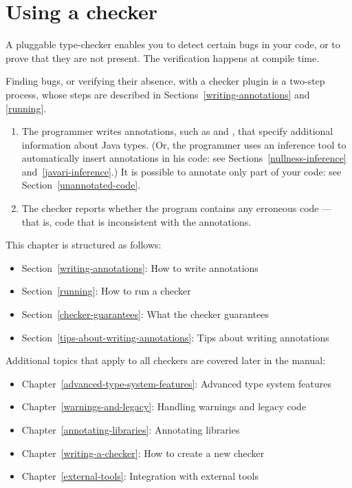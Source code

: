 

\htmlhr
\chapter{Using a checker\label{using-a-checker}}

A pluggable type-checker enables you to detect certain bugs in your code,
or to prove that they are not present.  The verification happens at compile
time.


Finding bugs, or verifying their absence, with a checker plugin is a two-step process, whose steps are
described in Sections~\ref{writing-annotations} and \ref{running}.

\begin{enumerate}

\item The programmer writes annotations, such as  and
  , that specify additional information about Java types.
  (Or, the programmer uses an inference tool to automatically insert
  annotations in his code:  see Sections~\ref{nullness-inference} and~\ref{javari-inference}.)
  It is possible to annotate only part of your code:  see
  Section~\ref{unannotated-code}.

\item The checker reports whether the program contains any erroneous code
  --- that is, code that is inconsistent with the annotations.

\end{enumerate}

This chapter is structured as follows:
\begin{itemize}
\item Section~\ref{writing-annotations}: How to write annotations
\item Section~\ref{running}:  How to run a checker
\item Section~\ref{checker-guarantees}: What the checker guarantees
\item Section~\ref{tips-about-writing-annotations}: Tips about writing annotations
\end{itemize}

Additional topics that apply to all checkers are covered later in the manual:
\begin{itemize}
\item Chapter~\ref{advanced-type-system-features}: Advanced type system features
\item Chapter~\ref{warnings-and-legacy}: Handling warnings and legacy code
\item Chapter~\ref{annotating-libraries}: Annotating libraries
\item Chapter~\ref{writing-a-checker}: How to create a new checker
\item Chapter~\ref{external-tools}: Integration with external tools
\end{itemize}


